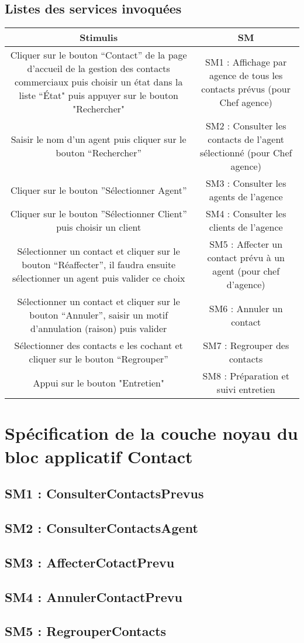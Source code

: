        \subsection{Listes des services invoquées}

\begin{tabular}{|c|c|}
\hline
Stimulis 
& SM \\
\hline
Cliquer sur le bouton “Contact” de la page d’accueil de la gestion des contacts commerciaux puis choisir un état dans la liste “État" puis appuyer sur le bouton "Rechercher"
& SM1 : Affichage par agence de tous les contacts prévus (pour Chef agence)\\
\hline
Saisir le nom d’un agent puis cliquer sur le bouton “Rechercher”
& SM2 : Consulter les contacts de l’agent sélectionné (pour Chef agence)\\
\hline
Cliquer sur le bouton ”Sélectionner Agent”
& SM3 : Consulter les agents de l'agence\\
\hline
Cliquer sur le bouton ”Sélectionner Client” puis choisir un client
& SM4 : Consulter les clients de l'agence\\
\hline
Sélectionner un contact et cliquer sur le bouton “Réaffecter”, il faudra ensuite sélectionner un agent puis valider ce choix
& SM5 : Affecter un contact prévu à un agent (pour chef d'agence)\\
\hline
Sélectionner un contact et cliquer sur le bouton “Annuler”, saisir un motif d'annulation (raison) puis valider
& SM6 : Annuler un contact\\
\hline
Sélectionner des contacts e les cochant et cliquer sur le bouton “Regrouper”
& SM7 : Regrouper des contacts\\
\hline
Appui sur le bouton "Entretien"
& SM8 : Préparation et suivi entretien\\
\hline
\end{tabular}


\section{Spécification de la couche noyau du bloc applicatif Contact}

       \subsection{SM1 : ConsulterContactsPrevus}

       \subsection{SM2 : ConsulterContactsAgent}

       \subsection{SM3 : AffecterCotactPrevu}

       \subsection{SM4 : AnnulerContactPrevu}

       \subsection{SM5 : RegrouperContacts}






